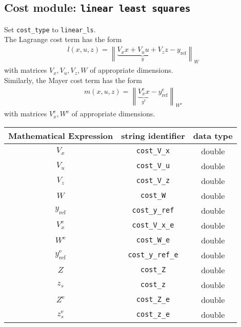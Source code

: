 \documentclass{article}
\newcommand{\code}[1]{\texttt{#1}}
\newcommand{\norm}[1]{\left\lVert#1\right\rVert}
\newcommand{\terminal}{^{\textrm{e}}}
\begin{document}
\subsection*{Cost module: \code{linear least squares}}
Set \code{cost\_type} to \code{linear\_ls}.\\
The Lagrange cost term has the form
\begin{align*}
l(x, u, z) = \norm{ \underbrace{V_x x + V_u u + V_z z}_y - y_{\textrm{ref}}}_W
\end{align*}
with matrices $ V_x, V_u, V_z, W $ of appropriate dimensions.\\
Similarly, the Mayer cost term has the form
\begin{align*}
m(x, u, z) = \norm{ \underbrace{V_x\terminal x}_{y\terminal} - y\terminal_{\textrm{ref}}}_{W\terminal}
\end{align*}
with matrices $ V\terminal_x, W\terminal $ of appropriate dimensions.
\begin{table}[h!]
	\centering
	\begin{tabular}{|c|c|c|}
		\toprule
		Mathematical Expression                    & string identifier & data type \\ \midrule
		$ V_x $ & \code{cost\_V\_x}    & double    \\ \midrule
		$ V_u $ & \code{cost\_V\_u}    & double    \\ \midrule
		$ V_z $ & \code{cost\_V\_z}    & double    \\ \midrule
		$ W $ & \code{cost\_W}    & double    \\ \midrule
		$ y_{\textrm{ref}} $ & \code{cost\_y\_ref}    & double    \\ \midrule
		$ V_x\terminal $ & \code{cost\_V\_x\_e}    & double    \\ \midrule
		$ W\terminal $ & \code{cost\_W\_e}    & double    \\ \midrule
		$ y_{\textrm{ref}}\terminal $ & \code{cost\_y\_ref\_e}    & double    \\ \midrule
		$ Z $ & \code{cost\_Z}    & double    \\ \midrule
		$ z_s $ & \code{cost\_z}    & double    \\ \midrule
		$ Z\terminal $ & \code{cost\_Z\_e}    & double    \\ \midrule
		$ z_s\terminal $ & \code{cost\_z\_e}    & double    \\
		\bottomrule
	\end{tabular}
\end{table}
\end{document}
